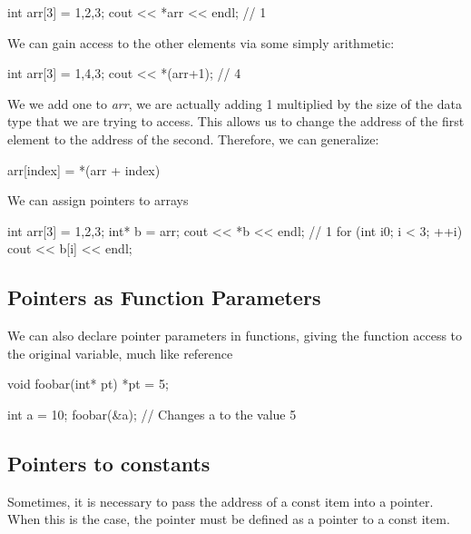 \documentclass{report}
\begin{document}
    \begin{cppcode}
int arr[3] = {1,2,3};
cout << *arr << endl; // 1
    \end{cppcode}
    
    \bigbreak \noindent 
    We can gain access to the other elements via some simply arithmetic:
    \bigbreak \noindent 
    
    \begin{cppcode}
int arr[3] = {1,4,3};
cout << *(arr+1); // 4
    \end{cppcode}
    
    \bigbreak \noindent 
    We we add one to \textit{arr}, we are actually adding 1 multiplied by the size of the data type that we are trying to access. This allows us to change the address of the first element to the address of the second.
    \bigbreak \noindent 
    Therefore, we can generalize:
    \bigbreak \noindent 
    
    \begin{cppcode}
arr[index] = *(arr + index)
    \end{cppcode}
    

    \bigbreak \noindent 
    We can assign pointers to arrays
    \bigbreak \noindent 
    
    \begin{cppcode}
int arr[3] = {1,2,3};
int* b = arr;
cout << *b << endl; // 1
for (int i{0}; i < 3; ++i) {
    cout << b[i] << endl;
}
    \end{cppcode}
    

    \pagebreak \bigbreak \noindent 
    \subsection{Pointers as Function Parameters}
    \bigbreak \noindent 
    We can also declare pointer parameters in functions, giving the function access to the original variable, much like reference
    \bigbreak \noindent 
    
    \begin{cppcode}
void foobar(int* pt) {
    *pt = 5;
}

int a = 10;
foobar(&a); // Changes a to the value 5

    \end{cppcode}
    

    \bigbreak \noindent 
    \subsection{Pointers to constants}
    \bigbreak \noindent 
    Sometimes, it is necessary to pass the address of a const item into a pointer. When this is the case, the pointer must be defined as a pointer to a const item.
    \bigbreak \noindent 
    
\end{document}
